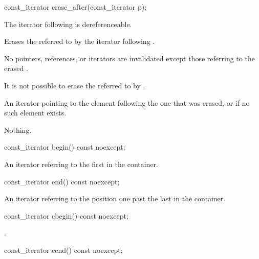 %
\begin{itemdecl}
const_iterator erase_after(const_iterator p);
\end{itemdecl}

\begin{itemdescr}
\pnum
\expects
The iterator following  is dereferenceable.

\pnum
\effects
Erases the  referred to by the iterator following .

\pnum
\ensures
No pointers, references, or iterators are invalidated
except those referring to the erased .
\begin{note}
It is not possible to erase the 
referred to by .
\end{note}

\pnum
\returns
An iterator pointing to the element following the one that was erased,
or  if no such element exists.

\pnum
\throws
Nothing.
\end{itemdescr}

%
\begin{itemdecl}
const_iterator begin() const noexcept;
\end{itemdecl}

\begin{itemdescr}
\pnum
\returns
An iterator referring to the first  in the container.
\end{itemdescr}

%
\begin{itemdecl}
const_iterator end() const noexcept;
\end{itemdecl}

\begin{itemdescr}
\pnum
\returns
An iterator referring to the position one past the last  in the container.
\end{itemdescr}

%
\begin{itemdecl}
const_iterator cbegin() const noexcept;
\end{itemdecl}

\begin{itemdescr}
\pnum
\returns
{}.
\end{itemdescr}

%
\begin{itemdecl}
const_iterator cend() const noexcept;
\end{itemdecl}

